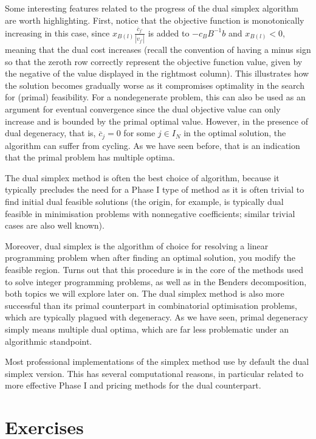 Some interesting features related to the progress of the dual simplex algorithm are worth highlighting. First, notice that the objective function is monotonically increasing in this case, since $x_{B(l)}\frac{\overline{c}_{j'}}{|v_{j'}|}$ is added to $-c_BB^{-1}b$ and $x_{B(l)} < 0$, meaning that the dual cost increases (recall the convention of having a minus sign so that the zeroth row correctly represent the objective function value, given by the negative of the value displayed in the rightmost column). This illustrates how the solution becomes gradually worse as it compromises optimality in the search for (primal) feasibility. For a nondegenerate problem, this can also be used as an argument for eventual convergence since the dual objective value can only increase and is bounded by the primal optimal value. However, in the presence of dual degeneracy, that is, $\overline{c}_{j} = 0$ for some $j \in I_N$ in the optimal solution, the algorithm can suffer from cycling. As we have seen before, that is an indication that the primal problem has multiple optima. 

The dual simplex method is often the best choice of algorithm, because it typically precludes the need for a Phase I type of method as it is often trivial to find initial dual feasible solutions (the origin, for example, is typically dual feasible in minimisation problems with nonnegative coefficients; similar trivial cases are also well known).

Moreover, dual simplex is the algorithm of choice for resolving a linear programming problem when after finding an optimal solution, you modify the feasible region. Turns out that this procedure is in the core of the methods used to solve integer programming problems, as well as in the Benders decomposition, both topics we will explore later on. The dual simplex method is also more successful than its primal counterpart in combinatorial optimisation problems, which are typically plagued with degeneracy. As we have seen, primal degeneracy simply means multiple dual optima, which are far less problematic under an algorithmic standpoint.

Most professional implementations of the simplex method use by default the dual simplex version. This has several computational reasons, in particular related to more effective Phase I and pricing methods for the dual counterpart.

\vfill
\pagebreak
 
\section{Exercises}

